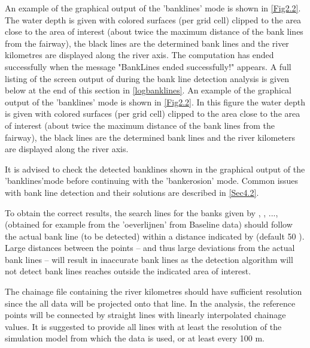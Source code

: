 An example of the graphical output of the 'banklines' mode is shown in \autoref{Fig2.2}.
The water depth is given with colored surfaces (per grid cell) clipped to the area close to the area of interest (about twice the maximum distance of the bank lines from the fairway), the black lines are the determined bank lines and the river kilometres are displayed along the river axis.
The computation has ended successfully when the message "BankLines ended successfully!" appears.
A full listing of the screen output of \dfastbe during the bank line detection analysis is given below at the end of this section in \autoref{logbanklines}. An example of the graphical output of the 'banklines' mode is shown in \autoref{Fig2.2}. In this figure the water depth is given with colored surfaces (per grid cell) clipped to the area close to the area of interest (about twice the maximum distance of the bank lines from the fairway), the black lines are the determined bank lines and the river kilometers are displayed along the river axis. 

\Note It is advised to check the detected banklines shown in the graphical output of the 'banklines'mode before continuing with the 'bankerosion' mode. Common issues with bank line detection and their solutions are described in \autoref{Sec4.2}.

\Note To obtain the correct results, the search lines for the banks given by , , ...,  (obtained for example from the 'oeverlijnen' from Baseline data) should follow the actual bank line (to be detected) within a distance indicated by  (default 50 ).
Large distances between the points -- and thus large deviations from the actual bank lines -- will result in inaccurate bank lines as the detection algorithm will not detect bank lines reaches outside the indicated area of interest.

\Note The chainage file containing the river kilometres should have sufficient resolution since the all data will be projected onto that line.
In the analysis, the reference points will be connected by straight lines with linearly interpolated chainage values.
It is suggested to provide all lines with at least the resolution of the simulation model from which the data is used, or at least every 100 m.


